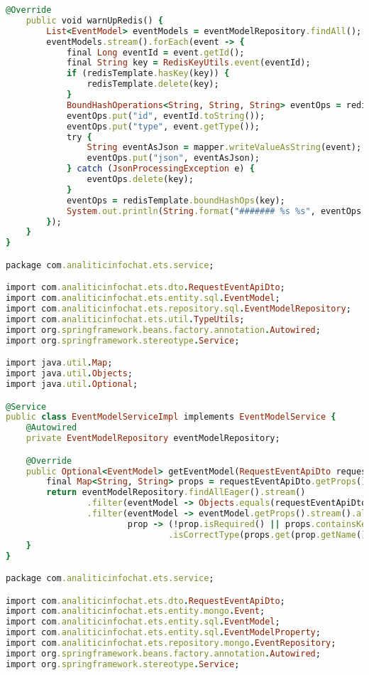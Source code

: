 \begin{lstlisting}[language=Ruby, style=rubystyle]
    @Override
    public void warnUpRedis() {
        List<EventModel> eventModels = eventModelRepository.findAll();
        eventModels.stream().forEach(event -> {
            final Long eventId = event.getId();
            final String key = RedisKeyUtils.event(eventId);
            if (redisTemplate.hasKey(key)) {
                redisTemplate.delete(key);
            }
            BoundHashOperations<String, String, String> eventOps = redisTemplate.boundHashOps(key);
            eventOps.put("id", eventId.toString());
            eventOps.put("type", event.getType());
            try {
                String eventAsJson = mapper.writeValueAsString(event);
                eventOps.put("json", eventAsJson);
            } catch (JsonProcessingException e) {
                eventOps.delete(key);
            }
            eventOps = redisTemplate.boundHashOps(key);
            System.out.println(String.format("####### %s %s", eventOps.get("type"), eventOps.get("id")));
        });
    }
}

package com.analiticinfochat.ets.service;

import com.analiticinfochat.ets.dto.RequestEventApiDto;
import com.analiticinfochat.ets.entity.sql.EventModel;
import com.analiticinfochat.ets.repository.sql.EventModelRepository;
import com.analiticinfochat.ets.util.TypeUtils;
import org.springframework.beans.factory.annotation.Autowired;
import org.springframework.stereotype.Service;

import java.util.Map;
import java.util.Objects;
import java.util.Optional;

@Service
public class EventModelServiceImpl implements EventModelService {
    @Autowired
    private EventModelRepository eventModelRepository;

    @Override
    public Optional<EventModel> getEventModel(RequestEventApiDto requestEventApiDto) {
        final Map<String, String> props = requestEventApiDto.getProps();
        return eventModelRepository.findAllEager().stream()
                .filter(eventModel -> Objects.equals(requestEventApiDto.getType(), eventModel.getType()))
                .filter(eventModel -> eventModel.getProps().stream().allMatch(
                        prop -> (!prop.isRequired() || props.containsKey(prop.getName()) && TypeUtils
                                .isCorrectType(props.get(prop.getName()), prop.getType())))).findAny();
    }
}

package com.analiticinfochat.ets.service;

import com.analiticinfochat.ets.dto.RequestEventApiDto;
import com.analiticinfochat.ets.entity.mongo.Event;
import com.analiticinfochat.ets.entity.sql.EventModel;
import com.analiticinfochat.ets.entity.sql.EventModelProperty;
import com.analiticinfochat.ets.repository.mongo.EventRepository;
import org.springframework.beans.factory.annotation.Autowired;
import org.springframework.stereotype.Service;


\end{lstlisting}
